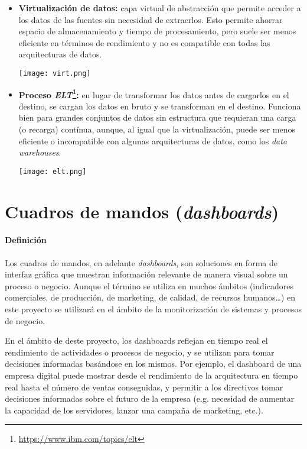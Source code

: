 \begin{itemize}
	\item \textbf{Virtualización de datos:} capa virtual de abstracción que
		permite acceder a los datos de las fuentes sin necesidad de extraerlos.
		Esto permite ahorrar espacio de almacenamiento y tiempo de
		procesamiento, pero suele ser menos eficiente en términos de rendimiento
		y no es compatible con todas las arquitecturas de datos.

		\begin{minipage}{\linewidth}
			\centering
			\texttt{[image: virt.png]}
		\end{minipage}
	\item \textbf{Proceso \textit{ELT}\footnote{\url{https://www.ibm.com/topics/elt}}:}
		en lugar de transformar los datos antes de cargarlos en el destino, se
		cargan los datos en bruto y se transforman en el destino. Funciona bien
		para grandes conjuntos de datos sin estructura que requieran una carga
		(o recarga) contínua, aunque, al igual que la virtualización, puede ser
		menos eficiente o incompatible con algunas arquitecturas de datos, como
		los \textit{data warehouses}.

		\begin{minipage}{\linewidth}
			\centering
			\texttt{[image: elt.png]}
		\end{minipage}
\end{itemize}


\newpage{}
\section{Cuadros de mandos (\textit{dashboards})}\label{sec:dashboards}
\paragraph{Definición}
Los cuadros de mandos, en adelante \textit{dashboards}, son soluciones en forma
de interfaz gráfica que muestran información relevante de manera visual sobre un
proceso o negocio. Aunque el término se utiliza en muchos ámbitos (indicadores
comerciales, de producción, de marketing, de calidad, de recursos humanos\ldots)
en este proyecto se utilizará en el ámbito de la monitorización de sistemas y
procesos de negocio.

En el ámbito de deste proyecto, los dashboards reflejan en tiempo real el
rendimiento de actividades o procesos de negocio, y se utilizan para tomar
decisiones informadas basándose en los mismos. Por ejemplo, el dashboard de una
empresa digital puede mostrar desde el rendimiento de la arquitectura en tiempo
real hasta el número de ventas conseguidas, y permitir a los directivos tomar
decisiones informadas sobre el futuro de la empresa (e.g. necesidad de aumentar
la capacidad de los servidores, lanzar una campaña de marketing, etc.).

